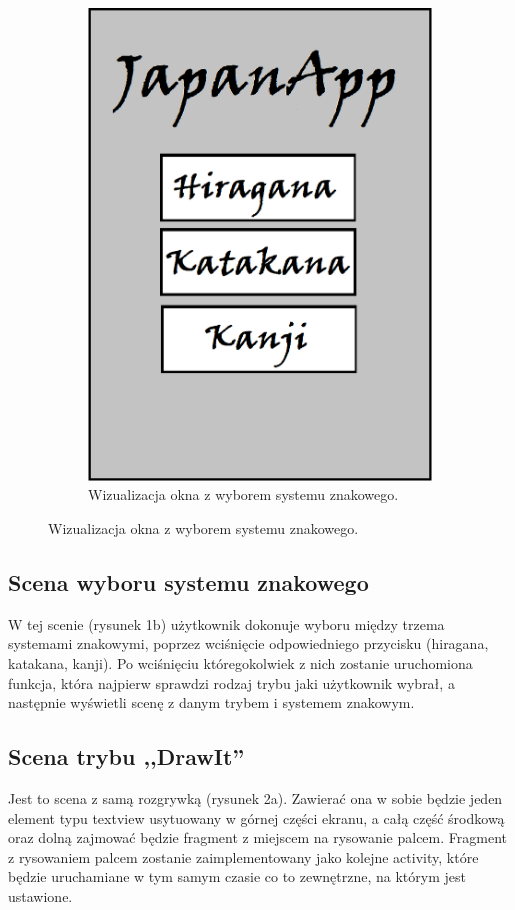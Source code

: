 \documentclass[15pt]{article}
\begin{document}
\begin{figure}[h!]
\begin{subfigure}[b]{0.35\linewidth}
      \includegraphics[width=\linewidth]{chose.png}
      \caption{Wizualizacja okna z wyborem systemu znakowego.}
      \label{fig:rysunek2}
    \end{subfigure}
  \end{figure}
  
  \subsection{Scena wyboru systemu znakowego}
  W tej scenie (rysunek 1b) użytkownik dokonuje wyboru między trzema systemami znakowymi, poprzez wciśnięcie odpowiedniego przycisku (hiragana, katakana, kanji). Po wciśnięciu któregokolwiek z nich zostanie uruchomiona funkcja, która najpierw sprawdzi rodzaj trybu jaki użytkownik wybrał, a następnie wyświetli scenę z danym trybem i systemem znakowym. 
  
  
  \subsection{Scena trybu ,,DrawIt''}
  Jest to scena z samą rozgrywką (rysunek 2a). Zawierać ona w sobie będzie jeden element typu textview usytuowany w górnej części ekranu, a całą część środkową oraz dolną zajmować będzie fragment z miejscem na rysowanie palcem. Fragment z rysowaniem palcem zostanie zaimplementowany jako kolejne activity, które będzie uruchamiane w tym samym czasie co to zewnętrzne, na którym jest ustawione. 
  
\end{document}
